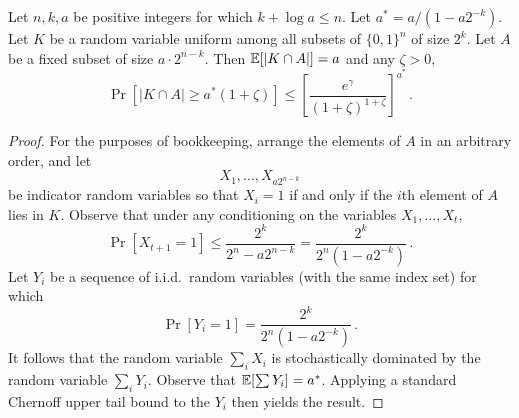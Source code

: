   \begin{theorem}
  Let $n,k,a$ be positive integers for which $k +\log a \leq n$.  Let $a^* = a/(1 - a2^{-k})$. Let $K$
  be a random variable uniform among all subsets of $\{0,1\}^n$ of
  size $2^k$. Let $A$ be a fixed subset of size $a \cdot 2^{n-k}$. Then
  $\operatorname*{\mathbb{E}}[|K \cap A|] = a$ and any $\zeta > 0$,
  \[
    \Pr[|K \cap A| \geq a^*(1 + \zeta)] \leq \left[\frac{e^\gamma}{(1+\zeta)^{1+\zeta}}\right]^{a^*}\,.
  \]
\end{theorem}
\begin{proof}
  For the purposes of bookkeeping, arrange the elements of $A$ in an
  arbitrary order, and let
  \[
    X_1, \ldots, X_{a2^{n-k}}
  \]
  be indicator random variables so that $X_i = 1$ if and only if the
  $i$th element of $A$ lies in $K$.  Observe that under any conditioning on the
  variables $X_1, \ldots, X_t$,
  \[
    \Pr[X_{t+1} = 1] \leq \frac{2^k}{2^n - a2^{n-k}} = \frac{2^k}{2^n(1 - a2^{-k})}\,.
  \]
   Let $Y_i$ be a sequence of
  i.i.d.\ random variables (with the same index set) for which
  \[
    \Pr[Y_i = 1] = \frac{2^{k}}{2^n(1 - a2^{-k})}\,.
  \]It follows that the random variable $\sum_i X_i$ is stochastically
  dominated by the random variable $\sum_i Y_i$. Observe that
  $\operatorname*{\mathbb{E}}[\sum Y_i] = a^*$. Applying a standard Chernoff upper tail
  bound to the $Y_i$ then yields the result.
\end{proof}